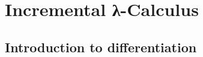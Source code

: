 









\def\deriveDefCore{%
\begin{align*}
  \ensuremath{\Derive{\lambda (\Varid{x}\typcolon\sigma)\to \Varid{t}}} &= \ensuremath{\lambda (\Varid{x}\typcolon\sigma)\;(\Varid{dx}\typcolon\Delta \sigma)\to \Derive{\Varid{t}}} \\
  \ensuremath{\Derive{\Varid{s}\;\Varid{t}}} &= \ensuremath{\Derive{\Varid{s}}\;\Varid{t}\;\Derive{\Varid{t}}} \\
  \ensuremath{\Derive{\Varid{x}}} &= \ensuremath{\Varid{dx}} \\
  \ensuremath{\Derive{\Varid{c}}} &= \ensuremath{\DeriveConst{\Varid{c}}}
\end{align*}
}




\part{Incremental λ-Calculus}
\label{part:incr}

\chapter{Introduction to differentiation}
\label{sec:intro}
\label{ch:static-diff-intro}

